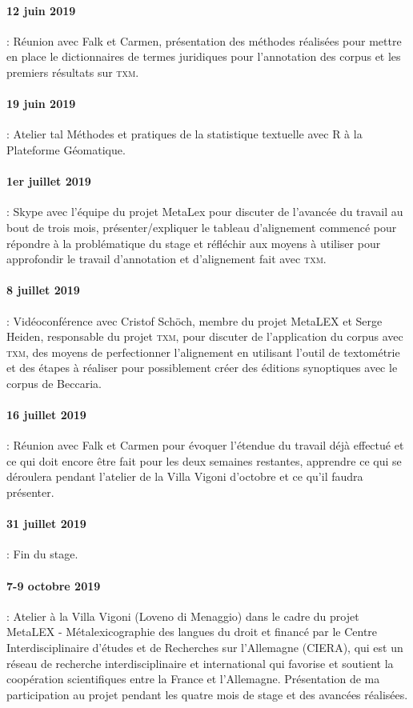 \paragraph{12 juin 2019} : Réunion avec Falk et Carmen, présentation des méthodes réalisées pour mettre en place le dictionnaires de termes juridiques pour l'annotation des corpus et les premiers résultats sur \textsc{txm}.

\paragraph{19 juin 2019} : Atelier \acrshort{tal} \og Méthodes et pratiques de la statistique textuelle avec R \fg{} à la Plateforme Géomatique.

\paragraph{1er juillet 2019} : Skype avec l'équipe du projet MetaLex pour discuter de l'avancée du travail au bout de trois mois, présenter/expliquer le tableau d'alignement commencé pour répondre à la problématique du stage et réfléchir aux moyens à utiliser pour approfondir le travail d'annotation et d'alignement fait avec \textsc{txm}.

\paragraph{8 juillet 2019} : Vidéoconférence avec Cristof Schöch, membre du projet MetaLEX et Serge Heiden, responsable du projet \textsc{txm}, pour discuter de l'application du corpus avec \textsc{txm}, des moyens de perfectionner l'alignement en utilisant l'outil de textométrie et des étapes à réaliser pour possiblement créer des éditions synoptiques avec le corpus de Beccaria.

\paragraph{16 juillet 2019} : Réunion avec Falk et Carmen pour évoquer l'étendue du travail déjà effectué et ce qui doit encore être fait pour les deux semaines restantes, apprendre ce qui se déroulera pendant l'atelier de la Villa Vigoni d'octobre et ce qu'il faudra présenter.

\paragraph{31 juillet 2019} : Fin du stage.

\paragraph{7-9 octobre 2019} : Atelier à la Villa Vigoni (Loveno di Menaggio) dans le cadre du projet \og MetaLEX - Métalexicographie des langues du droit \fg{} et financé par le Centre Interdisciplinaire d’études et de Recherches sur l’Allemagne (CIERA), qui est un réseau de recherche interdisciplinaire et international qui favorise et soutient la coopération scientifiques entre la France et l'Allemagne.  Présentation de ma participation au projet pendant les quatre mois de stage et des avancées réalisées.